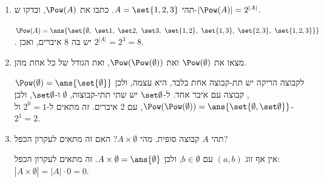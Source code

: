 \begin{enumerate}
\item תהי $A=\set{1,2,3}$. כתבו את $\Pow(A)$, ובדקו ש-$|\Pow(A)|=2^{|A|}$.
\begin{solbox}
$\Pow(A)=\ans{\set{\emptyset,\ \set1,\ \set2,\ \set3,\ \set{1,2},\ \set{1,3},\ \set{2,3},\ \set{1,2,3}}}$. יש בה 8 איברים, ואכן $2^{|A|}=2^3=8$.
\end{solbox}
\item מצאו את $\Pow(\emptyset)$ ואת $\Pow(\Pow(\emptyset))$, ואת הגודל של כל אחת מהן.
\begin{solbox}
לקבוצה הריקה יש תת-קבוצה אחת בלבד, היא עצמה, ולכן $\Pow(\emptyset)=\ans{\set{\emptyset}}$, קבוצה עם איבר אחד. ל-$\set\emptyset$ יש שתי תתי-קבוצות, $\emptyset$ ו-$\set\emptyset$, ולכן $\Pow(\Pow(\emptyset))=\ans{\set{\emptyset,\set\emptyset}}$, עם 2 איברים. זה מתאים ל-$2^0=1$ ול-$2^1=2$.
\end{solbox}
\item תהי $A$ קבוצה סופית. מהי $A\times\emptyset$? האם זה מתאים לעקרון הכפל?
\begin{solbox}
אין אף זוג $(a,b)$ עם $b\in\emptyset$, ולכן $A\times\emptyset=\ans{\emptyset}$. זה מתאים לעקרון הכפל: $|A\times\emptyset|=|A|\cdot0=0$.
\end{solbox}
\end{enumerate}
